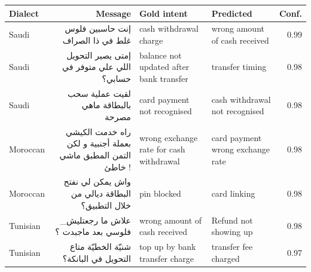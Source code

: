 \documentclass[border=2pt]{standalone}
\begin{document}
\small
\begin{tabular}{@{}l r l l r@{}}\toprule
Dialect & Message & Gold intent & Predicted & Conf.\\\midrule
Saudi & \textarabic{إنت حاسبين فلوس غلط في ذا الصراف} & cash withdrawal charge & wrong amount of cash received & 0.99\\
Saudi & \textarabic{إمتى يصير التحويل اللي علي متوفر في حسابي؟} & balance not updated after bank transfer & transfer timing & 0.98\\
Saudi & \textarabic{لقيت عملية سحب بالبطاقة ماهي مصرحة} & card payment not recognised & cash withdrawal not recognised & 0.98\\
Moroccan & \textarabic{راه خدمت الكيشي بعملة أجنبية و لكن التمن المطبق ماشي خاطئ !} & wrong exchange rate for cash withdrawal & card payment wrong exchange rate & 0.98\\
Moroccan & \textarabic{واش يمكن لي نفتح البطاقة ديالي من خلال التطبيق؟} & pin blocked & card linking & 0.98\\
Tunisian & \textarabic{\_علاش ما رجعتليش فلوسي بعد ماجبدت ؟} & wrong amount of cash received & Refund not showing up & 0.98\\
Tunisian & \textarabic{شنيّة الخطيّة متاع التحويل في البانكة؟} & top up by bank transfer charge & transfer fee charged & 0.97\\
\bottomrule\end{tabular}
\end{document}
